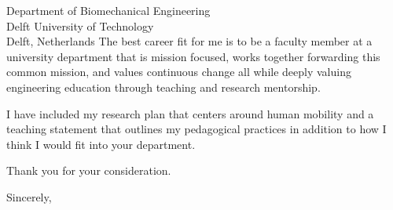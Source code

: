 \documentclass{letter}
\begin{document}
\begin{letter}{
  Department of Biomechanical Engineering \\
  Delft University of Technology \\
  Delft, Netherlands
}
The best career fit for me is to be a faculty member at a university department
that is mission focused, works together forwarding this common mission, and
values continuous change all while deeply valuing engineering education through
teaching and research mentorship.


I have included my research plan that centers around human mobility and a
teaching statement that outlines my pedagogical practices in addition to how I
think I would fit into your department.

Thank you for your consideration.

\closing{Sincerely,}

\end{letter}
\end{document}
